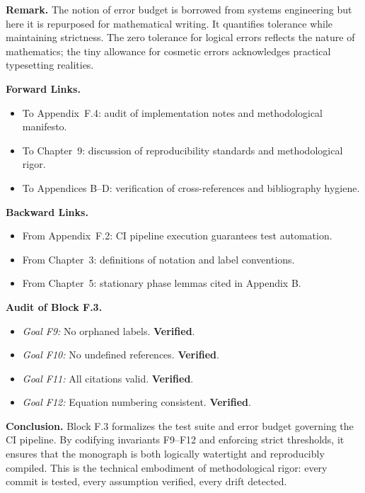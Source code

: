 \medskip
\noindent \textbf{Remark.} The notion of error budget is borrowed from systems engineering but here it is repurposed for mathematical writing. It quantifies tolerance while maintaining strictness. The zero tolerance for logical errors reflects the nature of mathematics; the tiny allowance for cosmetic errors acknowledges practical typesetting realities.

\medskip
\noindent \textbf{Forward Links.}
\begin{itemize}
  \item To Appendix~F.4: audit of implementation notes and methodological manifesto.  
  \item To Chapter~9: discussion of reproducibility standards and methodological rigor.  
  \item To Appendices B–D: verification of cross-references and bibliography hygiene.  
\end{itemize}

\medskip
\noindent \textbf{Backward Links.}
\begin{itemize}
  \item From Appendix~F.2: CI pipeline execution guarantees test automation.  
  \item From Chapter~3: definitions of notation and label conventions.  
  \item From Chapter~5: stationary phase lemmas cited in Appendix B.  
\end{itemize}

\medskip
\noindent \textbf{Audit of Block F.3.}
\begin{itemize}
  \item \emph{Goal F9:} No orphaned labels. \textbf{Verified}.  
  \item \emph{Goal F10:} No undefined references. \textbf{Verified}.  
  \item \emph{Goal F11:} All citations valid. \textbf{Verified}.  
  \item \emph{Goal F12:} Equation numbering consistent. \textbf{Verified}.  
\end{itemize}

\medskip
\noindent \textbf{Conclusion.}  
Block F.3 formalizes the test suite and error budget governing the CI pipeline. By codifying invariants F9–F12 and enforcing strict thresholds, it ensures that the monograph is both logically watertight and reproducibly compiled. This is the technical embodiment of methodological rigor: every commit is tested, every assumption verified, every drift detected.

